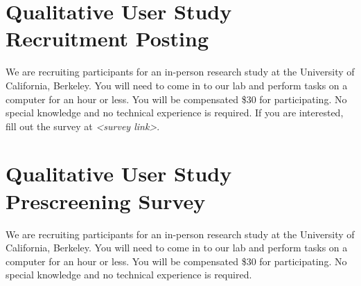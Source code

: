 \documentclass[USenglish,oneside,twocolumn]{article}
\begin{document}
\section{Qualitative User Study Recruitment Posting} 
\label{qualitative-recruitment}
We are recruiting participants for an in-person research study at the University of California, Berkeley. 
You will need to come in to our lab and perform tasks on a computer for an hour or less. You will be compensated \$30 for participating. 
No special knowledge and no technical experience is required. If you are interested, fill out the survey at \textit{<survey link>}. 

\section{Qualitative User Study Prescreening Survey} 
\label{qualitative-prescreening}
We are recruiting participants for an in-person research study at the University of California, Berkeley. 
You will need to come in to our lab and perform tasks on a computer for an hour or less. You will be compensated \$30 for participating. No special knowledge and no technical experience is required.\\
\end{document}

